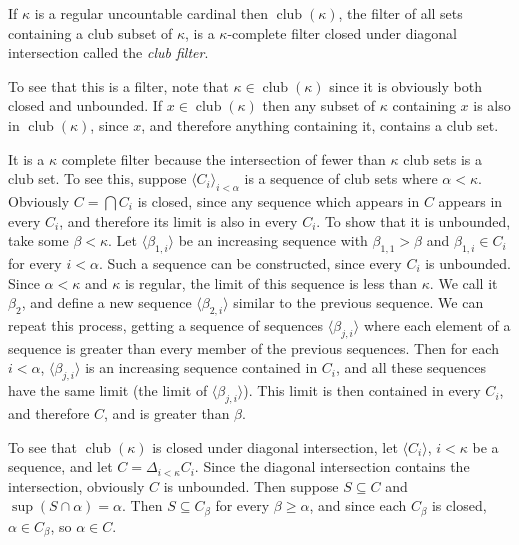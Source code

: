 \documentclass[12pt]{article}
\begin{document}
If $\kappa$ is a regular uncountable cardinal then $\operatorname{club}(\kappa)$, the filter of all sets containing a club subset of $\kappa$, is a $\kappa$-complete filter closed under diagonal intersection called the \emph{club filter}.

To see that this is a filter, note that $\kappa\in\operatorname{club}(\kappa)$ since it is obviously both closed and unbounded.  If $x\in\operatorname{club}(\kappa)$ then any subset of $\kappa$ containing $x$ is also in $\operatorname{club}(\kappa)$, since $x$, and therefore anything containing it, contains a club set.

It is a $\kappa$ complete filter because the intersection of fewer than $\kappa$ club sets is a club set.  To see this, suppose $\langle C_i\rangle_{i<\alpha}$ is a sequence of club sets where $\alpha<\kappa$.  Obviously $C=\bigcap C_i$ is closed, since any sequence which appears in $C$ appears in every $C_i$, and therefore its limit is also in every $C_i$.  To show that it is unbounded, take some $\beta<\kappa$.  Let $\langle \beta_{1,i}\rangle$ be an increasing sequence with $\beta_{1,1}>\beta$ and $\beta_{1,i}\in C_i$ for every $i<\alpha$.  Such a sequence can be constructed, since every $C_i$ is unbounded.  Since $\alpha<\kappa$ and $\kappa$ is regular, the limit of this sequence is less than $\kappa$.  We call it $\beta_2$, and define a new sequence $\langle\beta_{2,i}\rangle$ similar to the previous sequence.  We can repeat this process, getting a sequence of sequences $\langle\beta_{j,i}\rangle$ where each element of a sequence is greater than every member of the previous sequences.  Then for each $i<\alpha$, $\langle\beta_{j,i}\rangle$ is an increasing sequence contained in $C_i$, and all these sequences have the same limit (the limit of $\langle\beta_{j,i}\rangle$).  This limit is then contained in every $C_i$, and therefore $C$, and is greater than $\beta$.

To see that $\operatorname{club}(\kappa)$ is closed under diagonal intersection, let $\langle C_i\rangle$, $i<\kappa$ be a sequence, and let $C=\Delta_{i<\kappa} C_i$.  Since the diagonal intersection contains the intersection, obviously $C$ is unbounded.  Then suppose $S\subseteq C$ and $\sup(S\cap\alpha)=\alpha$.  Then $S\subseteq C_\beta$ for every $\beta\geq\alpha$, and since each $C_\beta$ is closed, $\alpha\in C_\beta$, so $\alpha\in C$.
\end{document}
